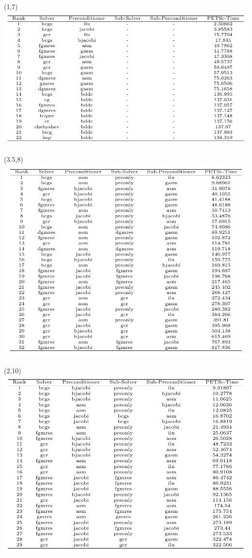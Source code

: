 \documentclass[11pt]{beamer}
\begin{document}
\begin{frame}
  \begin{textblock}{6}(1,7)
    \includegraphics[width=\textwidth]{petsc/combinations-1x1}\\
  \end{textblock}
  \begin{textblock}{6}(3.5,8)
    \includegraphics[width=\textwidth]{petsc/combinations-16x2}\\
  \end{textblock}
  \begin{textblock}{6}(2,10)
    \includegraphics[width=\textwidth]{petsc/combinations-4x1}\\

\end{textblock}
\end{frame}
\end{document}
